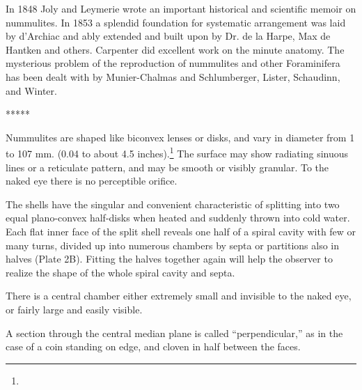 \documentclass[a4paper, 12pt, oneside]{article}
\begin{document}
In 1848 Joly and Leymerie wrote an important historical and scientific memoir on nummulites. In 1853 a splendid foundation for systematic arrangement was laid by d'Archiac and ably extended and built upon by Dr. de la Harpe, Max de Hantken and others. Carpenter did excellent work on the minute anatomy. The mysterious problem of the reproduction of nummulites and other Foraminifera has been dealt with by Munier-Chalmas and Schlumberger, Lister, Schaudinn, and Winter.

\centerline{*\hspace{15mm}*\hspace{15mm}*\hspace{15mm}*\hspace{15mm}*}
\bigskip

Nummulites are shaped like biconvex lenses or disks, and vary in diameter from 1 to 107 mm. (0.04 to about 4.5 inches).\footnote{} The surface may show radiating sinuous lines or a reticulate pattern, and may be smooth or visibly granular. To the naked eye there is no perceptible orifice.

The shells have the singular and convenient characteristic of splitting into two equal plano-convex half-disks when heated and suddenly thrown into cold water. Each flat inner face of the split shell reveals one half of a spiral cavity with few or many turns, divided up into numerous chambers by septa or partitions also in halves (Plate 2B). Fitting the halves together again will help the observer to realize the shape of the whole spiral cavity and septa.

There is a central chamber either extremely small and invisible to the naked eye, or fairly large and easily visible.

A section through the central median plane is called ``perpendicular,'' as in the case of a coin standing on edge, and cloven in half between the faces.
\end{document}
